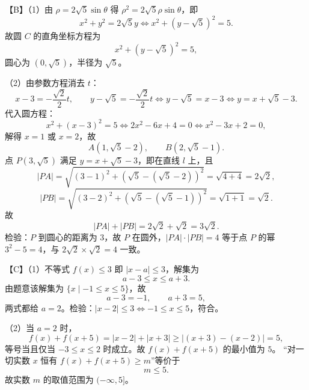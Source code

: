 \begin{answer}
【B】（1）由 $\rho=2\sqrt5\sin\theta$ 得 $\rho^2=2\sqrt5\rho\sin\theta$，即
\nopagebreak[4]
\[x^2+y^2=2\sqrt5y\iff x^2+\left(y-\sqrt5\right)^2=5.\]
故圆 $C$ 的直角坐标方程为
\nopagebreak[4]
\[x^2+\left(y-\sqrt5\right)^2=5,\]
圆心为 $\left(0,\sqrt5\right)$，半径为 $\sqrt5$。

（2）由参数方程消去 $t$：
\nopagebreak[4]
\[x-3=-\frac{\sqrt2}{2}t,\qquad y-\sqrt5=-\frac{\sqrt2}{2}t
\iff y-\sqrt5=x-3\iff y=x+\sqrt5-3.\]
代入圆方程：
\nopagebreak[4]
\[x^2+\left(x-3\right)^2=5\iff2x^2-6x+4=0\iff x^2-3x+2=0,\]
解得 $x=1$ 或 $x=2$，故
\nopagebreak[4]
\[A\left(1,\sqrt5-2\right),\qquad B\left(2,\sqrt5-1\right).\]
点 $P\left(3,\sqrt5\right)$ 满足 $y=x+\sqrt5-3$，即在直线 $l$ 上，且
\nopagebreak[4]
\[|PA|=\sqrt{(3-1)^2+\left(\sqrt5-(\sqrt5-2)\right)^2}=\sqrt{4+4}=2\sqrt2,\]
\nopagebreak[4]
\[|PB|=\sqrt{(3-2)^2+\left(\sqrt5-(\sqrt5-1)\right)^2}=\sqrt{1+1}=\sqrt2.\]
故
\nopagebreak[4]
\[|PA|+|PB|=2\sqrt2+\sqrt2=3\sqrt2.\]
检验：$P$ 到圆心的距离为 $3$，故 $P$ 在圆外，$|PA|\cdot|PB|=4$ 等于点 $P$ 的幂 $3^2-5=4$，与 $2\sqrt2\times\sqrt2=4$ 一致。

【C】（1）不等式 $f(x)\leqslant3$ 即 $|x-a|\leqslant3$，解集为
\nopagebreak[4]
\[a-3\leqslant x\leqslant a+3.\]
由题意该解集为 $\{x\mid-1\leqslant x\leqslant5\}$，故
\nopagebreak[4]
\[a-3=-1,\qquad a+3=5,\]
两式都给 $a=2$。检验：$|x-2|\leqslant3\iff-1\leqslant x\leqslant5$，符合。

（2）当 $a=2$ 时，
\nopagebreak[4]
\[f(x)+f(x+5)=|x-2|+|x+3|\geqslant\left|(x+3)-(x-2)\right|=5,\]
等号当且仅当 $-3\leqslant x\leqslant2$ 时成立。故 $f(x)+f(x+5)$ 的最小值为 $5$。
“对一切实数 $x$ 恒有 $f(x)+f(x+5)\geqslant m$”等价于
\nopagebreak[4]
\[m\leqslant5.\]
故实数 $m$ 的取值范围为 $(-\infty,5]$。


\end{answer}